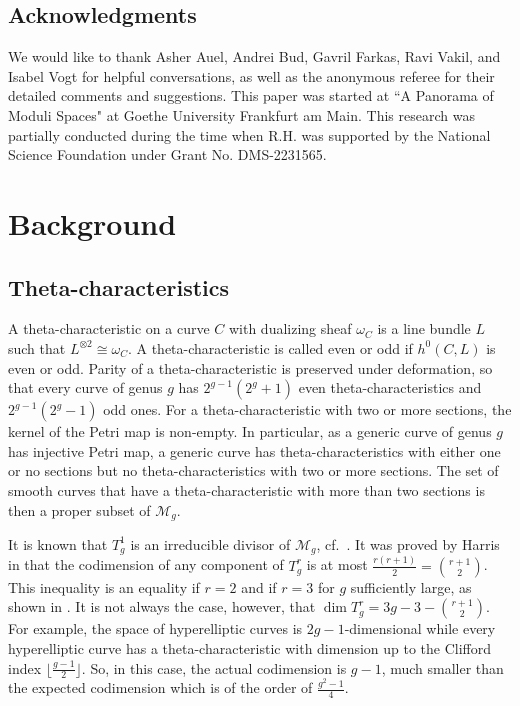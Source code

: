 \documentclass[11pt]{amsart}
\newcommand{\isom}{\cong}
\theoremstyle{definition}
\newtheorem{defn}[theorem]{Definition}
\theoremstyle{definition}
\begin{document}
\subsection*{Acknowledgments} We would like to thank Asher Auel, Andrei Bud, Gavril Farkas, Ravi Vakil, and Isabel Vogt for helpful conversations, as well as the anonymous referee for their detailed comments and suggestions.
This paper was started at ``A Panorama of Moduli Spaces" at Goethe University Frankfurt am Main. This research was partially conducted during the time when R.H. was supported by the National Science Foundation under Grant No. DMS-2231565.

\section{Background}\label{sec:Background}

\subsection{Theta-characteristics}

A theta-characteristic on a curve $C$ with dualizing sheaf $\omega_C$ is a line bundle $L$ such that $L^{\otimes 2}\isom \omega_C$.
A theta-characteristic  is called even or odd if $h^0(C,L)$ is even or odd. 
Parity of a theta-characteristic is preserved under deformation, so that every curve of genus $g$ has $2^{g-1}(2^g+1)$ even theta-characteristics and  $2^{g-1}(2^g-1)$ odd ones.
For a theta-characteristic with two or more sections, the kernel of the Petri map is non-empty. 
In particular, as a generic curve of genus $g$ has injective Petri map, a generic curve has theta-characteristics with either one or no sections but no theta-characteristics with two or more sections.
The set of smooth curves that have a theta-characteristic with more than two sections is then a proper subset of ${\mathcal M}_g$.


It is known that $T^1_g$ is an irreducible divisor of ${\mathcal M}_g$, cf.~\cite{thetdiv}.
It was proved by Harris in \cite{HTheta} that the codimension of any component of $T^r_g$ is at most $ \frac {r(r+1)}2={r+1\choose 2}$.
This inequality is an equality if $r=2$ and if $r=3$ for $g$ sufficiently large, as shown in \cite{semican}.
It is not always the case, however, that $\dim T^r_g=3g-3- {r+1\choose 2}$.
 For example, the space of  hyperelliptic curves is $2g-1$-dimensional while every hyperelliptic curve has a theta-characteristic with dimension up to the Clifford index $\lfloor \frac {g-1}2\rfloor $.
 So, in this case, the actual codimension is $g-1$, much smaller than the expected codimension which is of the order of $\frac{g^2-1}4$.
 
\end{document}
